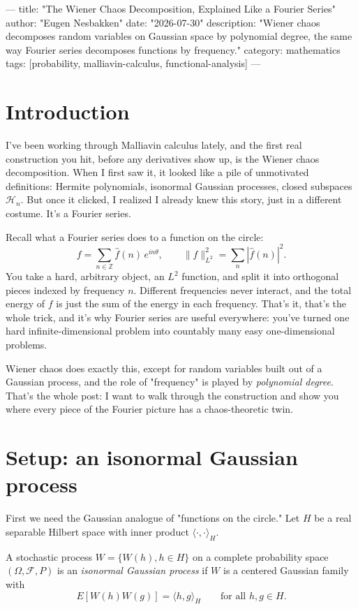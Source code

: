 ---
title: "The Wiener Chaos Decomposition, Explained Like a Fourier Series"
author: "Eugen Nesbakken"
date: "2026-07-30"
description: "Wiener chaos decomposes random variables on Gaussian space by polynomial degree, the same way Fourier series decomposes functions by frequency."
category: mathematics
tags: [probability, malliavin-calculus, functional-analysis]
---

\section{Introduction}

I've been working through Malliavin calculus lately, and the first real construction you hit, before any derivatives show up, is the Wiener chaos decomposition. When I first saw it, it looked like a pile of unmotivated definitions: Hermite polynomials, isonormal Gaussian processes, closed subspaces $\mathcal H_n$. But once it clicked, I realized I already knew this story, just in a different costume. It's a Fourier series.

Recall what a Fourier series does to a function on the circle:
$$
f = \sum_{n \in \mathbb{Z}} \hat f(n)\, e^{in\theta}, \qquad \|f\|_{L^2}^2 = \sum_n |\hat f(n)|^2.
$$
You take a hard, arbitrary object, an $L^2$ function, and split it into orthogonal pieces indexed by frequency $n$. Different frequencies never interact, and the total energy of $f$ is just the sum of the energy in each frequency. That's it, that's the whole trick, and it's why Fourier series are useful everywhere: you've turned one hard infinite-dimensional problem into countably many easy one-dimensional problems.

Wiener chaos does exactly this, except for random variables built out of a Gaussian process, and the role of "frequency" is played by \emph{polynomial degree}. That's the whole post: I want to walk through the construction and show you where every piece of the Fourier picture has a chaos-theoretic twin.

\section{Setup: an isonormal Gaussian process}

First we need the Gaussian analogue of "functions on the circle." Let $H$ be a real separable Hilbert space with inner product $\langle \cdot, \cdot \rangle_H$.

\begin{definition}
A stochastic process $W = \{W(h), h \in H\}$ on a complete probability space $(\Omega, \mathcal F, P)$ is an \emph{isonormal Gaussian process} if $W$ is a centered Gaussian family with
$$
E[W(h)W(g)] = \langle h, g \rangle_H \qquad \text{for all } h,g \in H.
$$
\end{definition}

